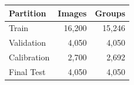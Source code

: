 \begin{tabular}{lrr}
\toprule
Partition & Images & Groups \\
\midrule
Train & 16,200 & 15,246 \\
Validation & 4,050 & 4,050 \\
Calibration & 2,700 & 2,692 \\
Final Test & 4,050 & 4,050 \\
\bottomrule
\end{tabular}
